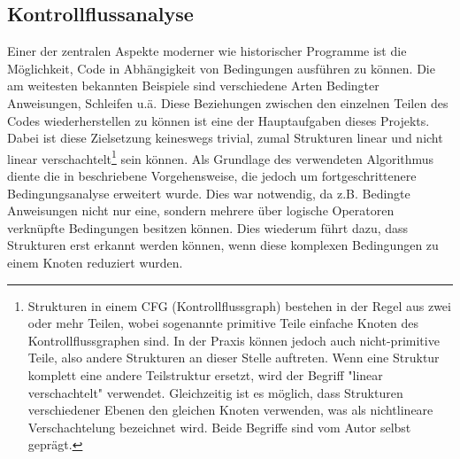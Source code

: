 \documentclass[11pt]{article}
\begin{document}
\subsection{Kontrollflussanalyse} \label{sec:CFA} Einer der zentralen Aspekte moderner wie
historischer Programme ist die Möglichkeit, Code in Abhängigkeit von Bedingungen ausführen zu
können. Die am weitesten bekannten Beispiele sind verschiedene Arten Bedingter Anweisungen, Schleifen
u.ä. Diese Beziehungen zwischen den einzelnen Teilen des Codes wiederherstellen zu können ist eine der
Hauptaufgaben dieses Projekts. Dabei ist diese Zielsetzung keineswegs trivial, zumal Strukturen
linear und nicht linear verschachtelt\footnote{Strukturen in einem CFG (Kontrollflussgraph)
bestehen in der Regel aus zwei oder mehr Teilen, wobei sogenannte primitive Teile einfache Knoten
des Kontrollflussgraphen sind. In der Praxis können jedoch auch nicht-primitive Teile, also andere
Strukturen an dieser Stelle auftreten. Wenn eine Struktur komplett eine andere Teilstruktur ersetzt,
wird der Begriff "linear verschachtelt" verwendet. Gleichzeitig ist es möglich, dass Strukturen
verschiedener Ebenen den gleichen Knoten verwenden, was als nichtlineare Verschachtelung bezeichnet
wird. Beide Begriffe sind vom Autor selbst geprägt.} sein können. Als Grundlage des verwendeten
Algorithmus diente die in \cite{structural_analysis:1} beschriebene Vorgehensweise, die jedoch um
fortgeschrittenere Bedingungsanalyse erweitert wurde. Dies war notwendig, da z.B. Bedingte Anweisungen
nicht nur eine, sondern mehrere über logische Operatoren verknüpfte Bedingungen besitzen können.
Dies wiederum führt dazu, dass Strukturen erst erkannt werden können, wenn diese komplexen Bedingungen
zu einem Knoten reduziert wurden.
\end{document}
